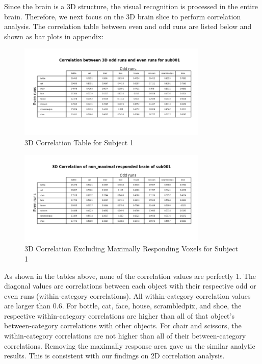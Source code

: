 \documentclass[11pt,twocolumn]{article}
\begin{document}
Since the brain is a 3D structure, the visual recognition is processed in the
entire brain. Therefore, we next focus on the 3D brain slice to perform 
correlation analysis. The correlation table between even and odd runs are
listed below and shown as bar plots in appendix:

\begin{figure}[h!]                                                              
\centering                                                                      
\includegraphics[width=90mm]{3d_correlation_table_sub001.png}                   
\caption{3D Correlation Table for Subject 1}                                    
\end{figure}                                                                    
                                                                                
\begin{figure}[h!]                                                              
\centering                                                                      
\includegraphics[width=90mm]{3d_non_max_correlation_table_sub001.png}           
\caption{3D Correlation Excluding Maximally Responding Voxels for Subject 1}    
\end{figure}     


As shown in the tables above, none of the correlation values are perfectly 1. 
The diagonal values are correlations between each object with their 
respective odd or 
even runs (within-category correlations). All within-category correlation 
values are larger than 0.6. For bottle, cat, face, house, scrambledpix, 
and shoe, the respective within-category correlations are higher than 
all of that object's between-category correlations with other objects.
For chair and scissors, the within-category correlations are not higher 
than all of their between-category correlations. Removing the maximally 
response area gave us the similar analytic results. This is consistent
with our findings on 2D correlation analysis.\\
\end{document}
